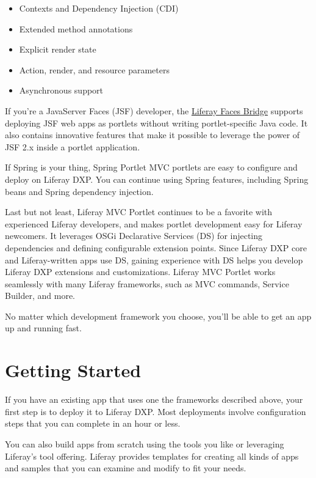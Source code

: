 \begin{itemize}
\tightlist
\item
  Contexts and Dependency Injection (CDI)
\item
  Extended method annotations
\item
  Explicit render state
\item
  Action, render, and resource parameters
\item
  Asynchronous support
\end{itemize}

If you're a JavaServer Faces (JSF) developer, the
\href{/docs/7-1/reference/-/knowledge_base/r/understanding-liferay-faces-bridge}{Liferay
Faces Bridge} supports deploying JSF web apps as portlets without
writing portlet-specific Java code. It also contains innovative features
that make it possible to leverage the power of JSF 2.x inside a portlet
application.

If Spring is your thing, Spring Portlet MVC portlets are easy to
configure and deploy on Liferay DXP. You can continue using Spring
features, including Spring beans and Spring dependency injection.

Last but not least, Liferay MVC Portlet continues to be a favorite with
experienced Liferay developers, and makes portlet development easy for
Liferay newcomers. It leverages OSGi Declarative Services (DS) for
injecting dependencies and defining configurable extension points. Since
Liferay DXP core and Liferay-written apps use DS, gaining experience
with DS helps you develop Liferay DXP extensions and customizations.
Liferay MVC Portlet works seamlessly with many Liferay frameworks, such
as MVC commands, Service Builder, and more.

No matter which development framework you choose, you'll be able to get
an app up and running fast.

\section{Getting Started}\label{getting-started}

If you have an existing app that uses one the frameworks described
above, your first step is to deploy it to Liferay DXP. Most deployments
involve configuration steps that you can complete in an hour or less.

You can also build apps from scratch using the tools you like or
leveraging Liferay's tool offering. Liferay provides templates for
creating all kinds of apps and samples that you can examine and modify
to fit your needs.

